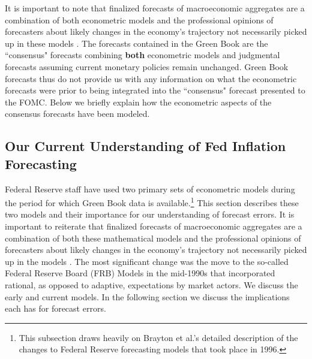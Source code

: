 \documentclass[a4paper]{article}\usepackage{graphicx, color}
\begin{document}
It is important to note that finalized forecasts of macroeconomic aggregates are a combination of both econometric models and the professional opinions of forecasters about likely changes in the economy's trajectory not necessarily picked up in these models \citep{Karamouzis1989,Reifschneider1997}. The forecasts contained in the Green Book are the ``consensus" forecasts combining {\bf{both}} econometric models and judgmental forecasts assuming current monetary policies remain unchanged. Green Book forecasts thus do not provide us with any information on what the econometric forecasts were prior to being integrated into the ``consensus" forecast presented to the FOMC. Below we briefly explain how the econometric aspects of the consensus forecasts have been modeled.

\subsection{Our Current Understanding of Fed Inflation Forecasting}

Federal Reserve staff have used two primary sets of econometric models during the period for which Green Book data is available.\footnote{This subsection draws heavily on Brayton et al.'s \cite{Brayton1997} detailed description of the changes to Federal Reserve forecasting models that took place in 1996.} This section describes these two models and their importance for our understanding of forecast errors. It is important to reiterate that finalized forecasts of macroeconomic aggregates are a combination of both these mathematical models and the professional opinions of forecasters about likely changes in the economy's trajectory not necessarily picked up in the models \citep{Karamouzis1989,Reifschneider1997,Taylor1997}. The most significant change was the move to the so-called Federal Reserve Board (FRB) Models in the mid-1990s that incorporated rational, as opposed to adaptive, expectations by market actors. We discuss the early and current models. In the following section we discuss the implications each has for forecast errors.
\end{document}
